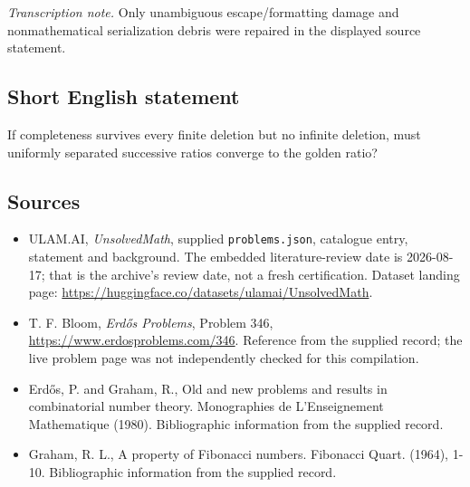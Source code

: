 \documentclass[11pt,a4paper]{article}
\begin{document}
{\small\emph{Transcription note.} Only unambiguous escape/formatting damage and nonmathematical serialization debris were repaired in the displayed source statement.}

\subsection{Short English statement}

If completeness survives every finite deletion but no infinite deletion, must uniformly separated successive ratios converge to the golden ratio?

\subsection{Sources}

{\small

\begin{itemize}

\item[\hypertarget{source:statement:1}{S1}] ULAM.AI, \emph{UnsolvedMath}, supplied \texttt{problems.json}, catalogue entry, statement and background. The embedded literature-review date is 2026-08-17; that is the archive’s review date, not a fresh certification. Dataset landing page: \url{https://huggingface.co/datasets/ulamai/UnsolvedMath}.

\item[\hypertarget{source:statement:2}{S2}] T. F. Bloom, \emph{Erdős Problems}, Problem 346, \url{https://www.erdosproblems.com/346}. Reference from the supplied record; the live problem page was not independently checked for this compilation.

\item[\hypertarget{source:statement:3}{S3}] Erd\H{o}s, P. and Graham, R., Old and new problems and results in combinatorial number theory. Monographies de L'Enseignement Mathematique (1980). Bibliographic information from the supplied record.

\item[\hypertarget{source:statement:4}{S4}] Graham, R. L., A property of Fibonacci numbers. Fibonacci Quart. (1964), 1-10. Bibliographic information from the supplied record.

\end{itemize}

}

\label{end:statement}
\end{document}
